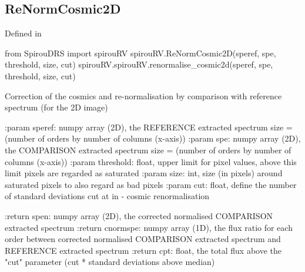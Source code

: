 \noindent\begin{minipage}{\textwidth}
\subsection{ReNormCosmic2D}

Defined in \spirouRV{}

\begin{pythonbox}
from SpirouDRS import spirouRV
spirouRV.ReNormCosmic2D(speref, spe, threshold, size, cut)
spirouRV.spirouRV.renormalise_cosmic2d(speref, spe, threshold, size, cut)
\end{pythonbox}

\begin{pythondocstring}
Correction of the cosmics and re-normalisation by comparison with
reference spectrum (for the 2D image)

:param speref: numpy array (2D), the REFERENCE extracted spectrum
               size = (number of orders by number of columns (x-axis))
:param spe:  numpy array (2D), the COMPARISON extracted spectrum
             size = (number of orders by number of columns (x-axis))
:param threshold: float, upper limit for pixel values, above this limit
                  pixels are regarded as saturated
:param size: int, size (in pixels) around saturated pixels to also regard
             as bad pixels
:param cut: float, define the number of standard deviations cut at in             -                  cosmic renormalisation

:return spen: numpy array (2D), the corrected normalised COMPARISON
              extracted spectrum
:return cnormspe: numpy array (1D), the flux ratio for each order between
                  corrected normalised COMPARISON extracted spectrum and
                  REFERENCE extracted spectrum
:return cpt: float, the total flux above the "cut" parameter
             (cut * standard deviations above median)
\end{pythondocstring}
\end{minipage}


